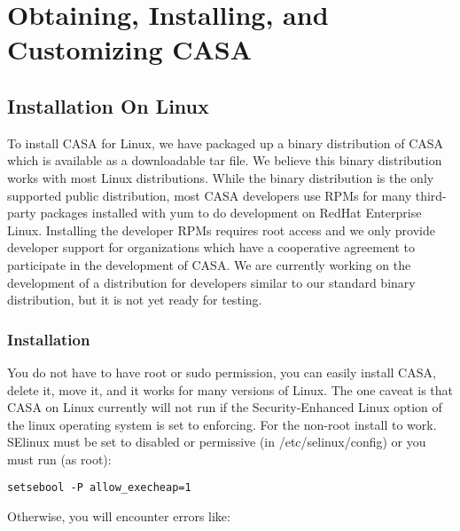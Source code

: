 

\chapter[Appendix: Obtaining, Installing, and Customizing CASA]{Obtaining,
  Installing, and Customizing CASA}
\label{chapter:install}

\section{Installation On Linux}
\label{section:install.script}

To install CASA for Linux, we have packaged up a binary distribution
of CASA which is available as a downloadable tar file. We believe this
binary distribution works with most Linux distributions. While the
binary distribution is the only supported public distribution, most
CASA developers use RPMs for many third-party packages installed with
yum to do development on RedHat Enterprise Linux. Installing the
developer RPMs requires root access and we only provide developer
support for organizations which have a cooperative agreement to
participate in the development of CASA. We are currently working on
the development of a distribution for developers similar to our
standard binary distribution, but it is not yet ready for testing.


\subsection{Installation}

You do not have to have root or sudo permission, you can easily
install CASA, delete it, move it, and it works for many versions of
Linux. The one caveat is that CASA on Linux currently will not run if
the Security-Enhanced Linux option of the linux operating system is
set to enforcing. For the non-root install to work. SElinux must be
set to disabled or permissive (in /etc/selinux/config) or you must run
(as root):

\small
\begin{verbatim}
setsebool -P allow_execheap=1
\end{verbatim}
\normalsize

Otherwise, you will encounter errors like:



